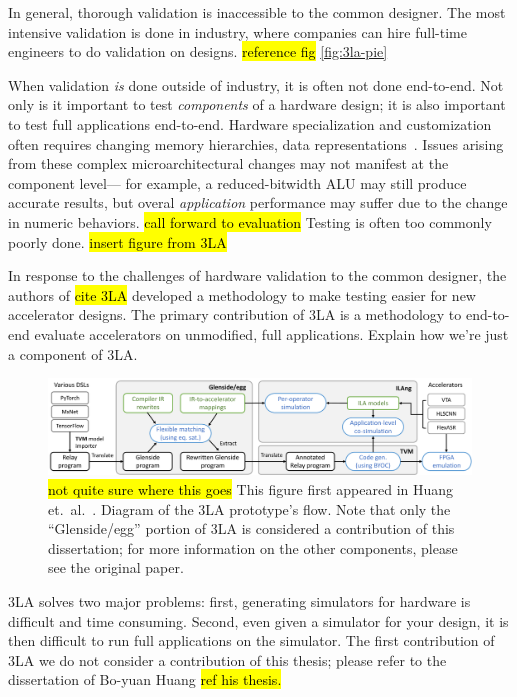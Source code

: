 In general,
  thorough validation
  is inaccessible
  to the common designer.
The most intensive validation
  is done in industry,
  where companies can hire full-time
  engineers
  to do validation
  on designs.
\hl{reference fig} \cref{fig:3la-pie}
  
When validation \textit{is} done
  outside of industry,
  it is often not done end-to-end.
Not only is it important
  to test \textit{components}
  of a hardware design;
  it is also important
  to test full applications end-to-end.
Hardware specialization and customization often
  requires changing memory hierarchies,
  data representations~\cite{chan2014itrs,fang2019understanding,lai2021programming}.
Issues arising from these complex
  microarchitectural changes
  may not manifest
  at the component level---%
  for example, a reduced-bitwidth
  ALU
  may still produce accurate results,
  but overal \textit{application}
  performance
  may suffer
  due to the change in numeric behaviors.
\hl{call forward to evaluation}
Testing is often 
  too commonly poorly done.
\hl{insert figure from 3LA}


In response to the challenges
  of hardware validation
  to the common designer,
  the authors of \hl{cite 3LA}
  developed
  a methodology
  to make testing
  easier for new accelerator designs.
The primary contribution of 3LA
  is 
  a methodology to end-to-end evaluate accelerators on unmodified, full applications.
Explain how we're just a component of 3LA.

\begin{figure}
    \centering
    \includegraphics[width=\textwidth]{assets/3la-diagram.pdf}
    \caption{
    \hl{not quite sure where this goes}
This figure first appeared
  in Huang et.~al.~\cite{3la}.
Diagram of the 3LA prototype's flow.
Note that only the ``Glenside/egg''
  portion of 3LA
  is considered a contribution
  of this dissertation;
  for more information on the other components,
  please see the original paper.
}
    \label{fig:3la-diagram}
\end{figure}

3LA solves two major problems:
  first, generating simulators
  for hardware
  is difficult
  and time consuming.
Second, even given a simulator
  for your design,
  it is then difficult
  to run full applications
  on the simulator.
The first contribution
  of 3LA
  we do not consider
  a contribution of this thesis;
  please refer to the dissertation
  of Bo-yuan Huang
  \hl{ref his thesis.}

